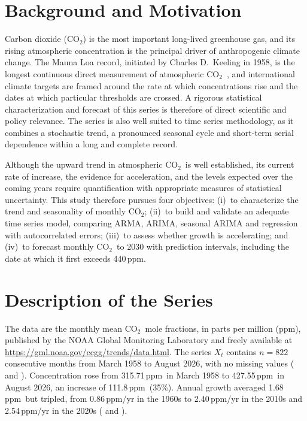 \documentclass[11pt,letterpaper]{article}
\newcommand{\co}{CO$_2$}
\newcommand{\ppm}{\,ppm}
\begin{document}
\section{Background and Motivation}
Carbon dioxide (\co) is the most important long-lived greenhouse gas, and its rising atmospheric concentration is the principal driver of anthropogenic climate change. The Mauna Loa record, initiated by Charles D.~Keeling in 1958, is the longest continuous direct measurement of atmospheric \co\ \citep{keeling1960}, and international climate targets are framed around the rate at which concentrations rise and the dates at which particular thresholds are crossed. A rigorous statistical characterization and forecast of this series is therefore of direct scientific and policy relevance. The series is also well suited to time series methodology, as it combines a stochastic trend, a pronounced seasonal cycle and short-term serial dependence within a long and complete record.

Although the upward trend in atmospheric \co\ is well established, its current rate of increase, the evidence for acceleration, and the levels expected over the coming years require quantification with appropriate measures of statistical uncertainty. This study therefore pursues four objectives: (i)~to characterize the trend and seasonality of monthly \co; (ii)~to build and validate an adequate time series model, comparing ARMA, ARIMA, seasonal ARIMA and regression with autocorrelated errors; (iii)~to assess whether growth is accelerating; and (iv)~to forecast monthly \co\ to 2030 with prediction intervals, including the date at which it first exceeds 440\ppm.

\section{Description of the Series}
The data are the monthly mean \co\ mole fractions, in parts per million (ppm), published by the NOAA Global Monitoring Laboratory \citep{noaa2026} and freely available at \url{https://gml.noaa.gov/ccgg/trends/data.html}. The series $X_t$ contains $n = 822$ consecutive months from March 1958 to August 2026, with no missing values ( and ). Concentration rose from 315.71\ppm\ in March 1958 to 427.55\ppm\ in August 2026, an increase of 111.8\ppm\ (35\%). Annual growth averaged 1.68\ppm\ but tripled, from 0.86\ppm/yr in the 1960s to 2.40\ppm/yr in the 2010s and 2.54\ppm/yr in the 2020s ( and ).
\end{document}
